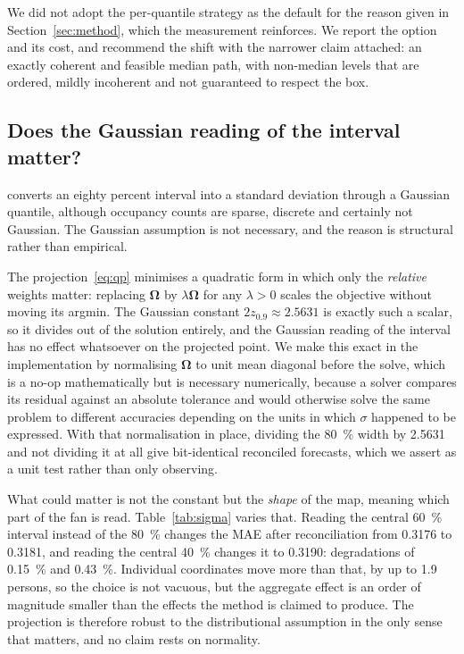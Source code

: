 \documentclass[utf8]{FrontiersinHarvard}
\newif\ifrevisionmarkup
\newcommand{\new}[1]{\ifrevisionmarkup\textcolor{revision}{#1}\else#1\fi}
\newif\ifsecondrevisionmarkup
\newcommand{\rev}[1]{\ifsecondrevisionmarkup\textcolor{revisiontwo}{#1}\else#1\fi}
\theoremstyle{plain}
\theoremstyle{definition}
\theoremstyle{remark}
\newcommand{\bOm}{\bm{\Omega}}
\begin{document}
\new{We did not adopt \rev{the per-quantile strategy} as the default for the reason given in Section~\ref{sec:method}\rev{, which the measurement reinforces}. We report the option and its cost, and recommend the shift with the narrower claim attached\rev{: an exactly coherent and feasible median path, with non-median levels that are ordered, mildly incoherent and not guaranteed to respect the box}.}

\subsection{\new{Does the Gaussian reading of the interval matter?}}
\label{sec:sigma}

\new{ converts an eighty percent interval into a standard deviation through a Gaussian quantile\rev{, although} occupancy counts are sparse, discrete and certainly not Gaussian. \rev{The Gaussian assumption is not necessary,} and the reason is structural rather than empirical.}

\new{The projection~\eqref{eq:qp} minimises a quadratic form in which only the \emph{relative} weights matter: replacing $\bOm$ by $\lambda\bOm$ for any $\lambda>0$ scales the objective without moving its argmin. The Gaussian constant $2z_{0.9} \approx 2.5631$ is exactly such a scalar, so it divides out of the solution entirely, and the Gaussian reading of the interval has no effect whatsoever on the projected point. We make this exact in the implementation by normalising $\bOm$ to unit mean diagonal before the solve, which is a no-op mathematically but is necessary numerically, because a solver compares its residual against an absolute tolerance and would otherwise solve the same problem to different accuracies depending on the units in which $\sigma$ happened to be expressed. With that normalisation in place, dividing the \SI{80}{\percent} width by \num{2.5631} and not dividing it at all give bit-identical reconciled forecasts, which we assert as a unit test rather than only observing.}

\new{What could matter is not the constant but the \emph{shape} of the map, meaning which part of the fan is read. Table~\ref{tab:sigma} varies that. Reading the central \SI{60}{\percent} interval instead of the \SI{80}{\percent} changes the MAE after reconciliation from \num{0.3176} to \num{0.3181}, and reading the central \SI{40}{\percent} changes it to \num{0.3190}: degradations of \SI{0.15}{\percent} and \SI{0.43}{\percent}. Individual coordinates move more than that, by up to \num{1.9} persons, so the choice is not vacuous, but the aggregate effect is an order of magnitude smaller than the effects the method is claimed to produce. The projection is therefore robust to the distributional assumption in the only sense that matters, and \rev{no claim rests} on normality.}
\end{document}
